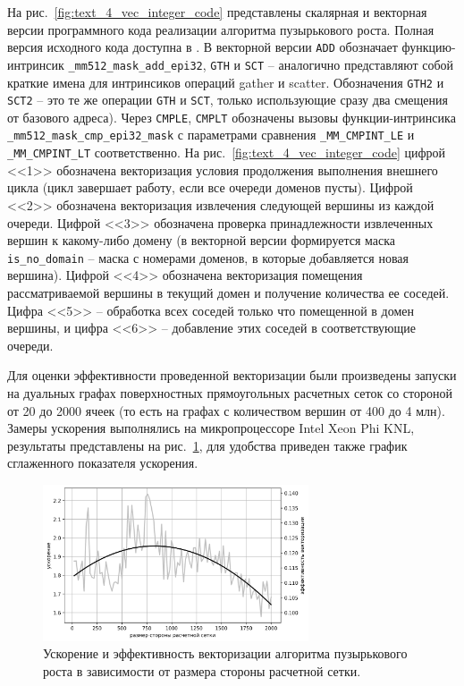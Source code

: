 На рис.~\ref{fig:text_4_vec_integer_code} представлены скалярная и векторная версии программного кода реализации алгоритма пузырькового роста.
Полная версия исходного кода доступна в \cite{comboptGithub}.
В векторной версии \texttt{ADD} обозначает функцию-интринсик \texttt{\_mm512\_mask\_add\_epi32}, \texttt{GTH} и \texttt{SCT} -- аналогично представляют собой краткие имена для интринсиков операций gather и scatter.
Обозначения \texttt{GTH2} и \texttt{SCT2} -- это те же операции \texttt{GTH} и \texttt{SCT}, только использующие сразу два смещения от базового адреса).
Через \texttt{CMPLE}, \texttt{CMPLT} обозначены вызовы функции-интринсика \texttt{\_mm512\_mask\_cmp\_epi32\_mask} с параметрами сравнения \texttt{\_MM\_CMPINT\_LE} и \texttt{\_MM\_CMPINT\_LT} соответственно.
На рис.~\ref{fig:text_4_vec_integer_code} цифрой <<1>> обозначена векторизация условия продолжения выполнения внешнего цикла (цикл завершает работу, если все очереди доменов пусты).
Цифрой <<2>> обозначена векторизация извлечения следующей вершины из каждой очереди.
Цифрой <<3>> обозначена проверка принадлежности извлеченных вершин к какому-либо домену (в векторной версии формируется маска \texttt{is\_no\_domain} -- маска с номерами доменов, в которые добавляется новая вершина).
Цифрой <<4>> обозначена векторизация помещения рассматриваемой вершины в текущий домен и получение количества ее соседей. 
Цифра <<5>> -- обработка всех соседей только что помещенной в домен вершины, и цифра <<6>> -- добавление этих соседей в соответствующие очереди.

Для оценки эффективности проведенной векторизации были произведены запуски на дуальных графах поверхностных прямоугольных расчетных сеток со стороной от 20 до 2000 ячеек (то есть на графах с количеством вершин от 400 до 4 млн).
Замеры ускорения выполнялись на микропроцессоре Intel Xeon Phi KNL\label{abbr:knl-12}, результаты представлены на рис.~\ref{fig:text_4_vec_integer_sp}, для удобства приведен также график сглаженного показателя ускорения.

\begin{figure}[ht]
\centering
\includegraphics[width=0.7\textwidth]{fig/vec_genetic_chart_speedup_rus.png}
\singlespacing
{}\caption{Ускорение и эффективность векторизации алгоритма пузырькового роста в зависимости от размера стороны расчетной сетки.}
\label{fig:text_4_vec_integer_sp}
\end{figure}

